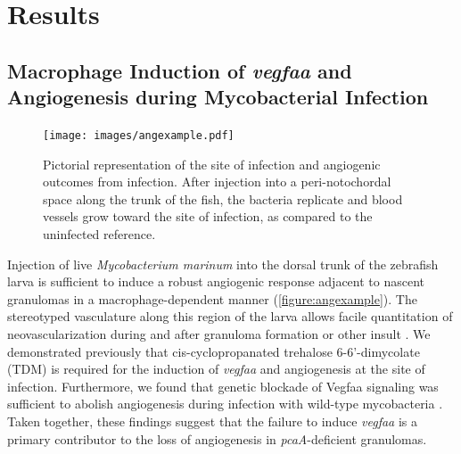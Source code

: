 \section{Results}

\subsection{Macrophage Induction of \textit{vegfaa} and Angiogenesis during Mycobacterial Infection}

\begin{figure}
\centering
\texttt{[image: images/angexample.pdf]}
\caption{Pictorial representation of the site of infection and angiogenic outcomes from infection. After injection into a peri-notochordal space along the trunk of the fish, the bacteria replicate and blood vessels grow toward the site of infection, as compared to the uninfected reference.}
\label{figure:angexample}

\end{figure}

Injection of live \textit{Mycobacterium marinum} into the dorsal trunk of the zebrafish larva is sufficient to induce a robust angiogenic response adjacent to nascent granulomas in a macrophage-dependent manner \citep{Oehlers2015} (\autoref{figure:angexample}). The stereotyped vasculature along this region of the larva allows facile quantitation of neovascularization during and after granuloma formation or other insult \citep{Lawson2002, Jin2005, Gore2012, Matsuoka2018}. We demonstrated previously that cis-cyclopropanated trehalose 6-6'-dimycolate (TDM) is required for the induction of \textit{vegfaa} and angiogenesis at the site of infection. Furthermore, we found that genetic blockade of Vegfaa signaling was sufficient to abolish angiogenesis during infection with wild-type mycobacteria \citep{Walton2018}. Taken together, these findings suggest that the failure to induce \textit{vegfaa} is a primary contributor to the loss of angiogenesis in \textit{pcaA}-deficient granulomas.

